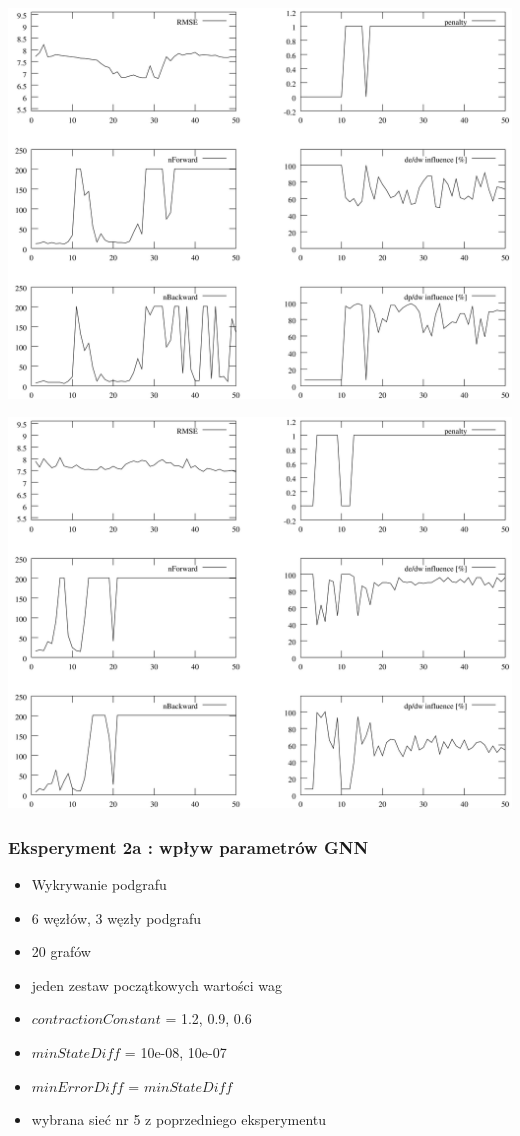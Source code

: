 \documentclass{beamer}
\begin{document}
\begin{frame}
	\includegraphics[scale=0.065]{img/gnn1}
\end{frame}
\begin{frame}
	\includegraphics[scale=0.065]{img/gnn8}
\end{frame}

\begin{frame}
\frametitle{Eksperyment 2a : wpływ parametrów GNN}
\begin{itemize}
	\item Wykrywanie podgrafu
	\item 6 węzłów, 3 węzły podgrafu
	\item 20 grafów
	\item jeden zestaw początkowych wartości wag
	\item $contractionConstant$ = 1.2, 0.9, 0.6
	\item $minStateDiff$ = 10e-08, 10e-07
	\item $minErrorDiff$ = $minStateDiff$
	\item wybrana sieć nr 5 z poprzedniego eksperymentu
\end{itemize}
\end{frame}
\end{document}
